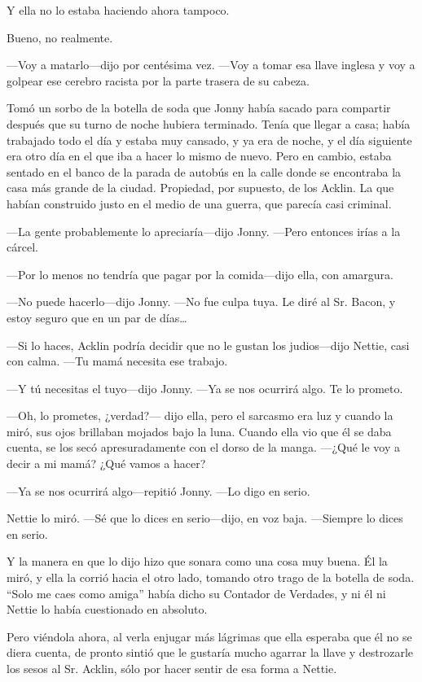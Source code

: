 Y ella no lo estaba haciendo ahora tampoco.

Bueno, no realmente.

---Voy a matarlo---dijo por centésima vez. ---Voy a tomar esa llave
inglesa y voy a golpear ese cerebro racista por la parte trasera de su
cabeza.

Tomó un sorbo de la botella de soda que Jonny había sacado para
compartir después que su turno de noche hubiera terminado. Tenía que
llegar a casa; había trabajado todo el día y estaba muy cansado, y ya
era de noche, y el día siguiente era otro día en el que iba a hacer lo
mismo de nuevo. Pero en cambio, estaba sentado en el banco de la parada
de autobús en la calle donde se encontraba la casa más grande de la
ciudad. Propiedad, por supuesto, de los Acklin. La que habían construido
justo en el medio de una guerra, que parecía casi criminal.

---La gente probablemente lo apreciaría---dijo Jonny. ---Pero entonces
irías a la cárcel.

---Por lo menos no tendría que pagar por la comida---dijo ella, con
amargura.

---No puede hacerlo---dijo Jonny. ---No fue culpa tuya. Le diré al Sr.
Bacon, y estoy seguro que en un par de días\ldots{}

---Si lo haces, Acklin podría decidir que no le gustan los judios---dijo
Nettie, casi con calma. ---Tu mamá necesita ese trabajo.

---Y tú necesitas el tuyo---dijo Jonny. ---Ya se nos ocurrirá algo. Te
lo prometo.

---Oh, lo prometes, ¿verdad?--- dijo ella, pero el sarcasmo era luz y
cuando la miró, sus ojos brillaban mojados bajo la luna. Cuando ella vio
que él se daba cuenta, se los secó apresuradamente con el dorso de la
manga. ---¿Qué le voy a decir a mi mamá? ¿Qué vamos a hacer?

---Ya se nos ocurrirá algo---repitió Jonny. ---Lo digo en serio.

Nettie lo miró. ---Sé que lo dices en serio---dijo, en voz baja.
---Siempre lo dices en serio.

Y la manera en que lo dijo hizo que sonara como una cosa muy buena. Él
la miró, y ella la corrió hacia el otro lado, tomando otro trago de la
botella de soda. ``Solo me caes como amiga'' había dicho su Contador de
Verdades, y ni él ni Nettie lo había cuestionado en absoluto.

Pero viéndola ahora, al verla enjugar más lágrimas que ella esperaba que
él no se diera cuenta, de pronto sintió que le gustaría mucho agarrar la
llave y destrozarle los sesos al Sr. Acklin, sólo por hacer sentir de
esa forma a Nettie.

